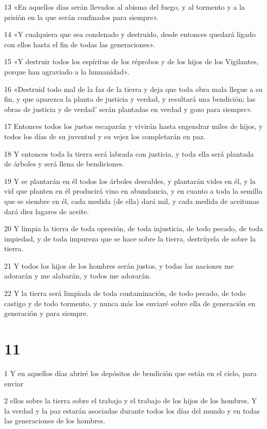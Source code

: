 \par 13 «En aquellos días serán llevados al abismo del fuego, y al tormento y a la prisión en la que serán confinados para siempre».
\par 14 «Y cualquiera que sea condenado y destruido, desde entonces quedará ligado con ellos hasta el fin de todas las generaciones».
\par 15 «Y destruir todos los espíritus de los réprobos y de los hijos de los Vigilantes, porque han agraviado a la humanidad».
\par 16 «Destruid todo mal de la faz de la tierra y deja que toda obra mala llegue a su fin, y que aparezca la planta de justicia y verdad, y resultará una bendición; las obras de justicia y de verdad' serán plantadas en verdad y gozo para siempre».
\par 17 Entonces todos los justos escaparán y vivirán hasta engendrar miles de hijos, y todos los días de su juventud y su vejez los completarán en paz.
\par 18 Y entonces toda la tierra será labrada con justicia, y toda ella será plantada de árboles y será llena de bendiciones.
\par 19 Y se plantarán en él todos los árboles deseables, y plantarán vides en él, y la vid que planten en él producirá vino en abundancia, y en cuanto a toda la semilla que se siembre en él, cada medida (de ella) dará mil, y cada medida de aceitunas dará diez lagares de aceite.
\par 20 Y limpia la tierra de toda opresión, de toda injusticia, de todo pecado, de toda impiedad, y de toda impureza que se hace sobre la tierra, destrúyela de sobre la tierra.
\par 21 Y todos los hijos de los hombres serán justos, y todas las naciones me adorarán y me alabarán, y todos me adorarán.
\par 22 Y la tierra será limpiada de toda contaminación, de todo pecado, de todo castigo y de todo tormento, y nunca más los enviaré sobre ella de generación en generación y para siempre.

\chapter{11}

\par 1 Y en aquellos días abriré los depósitos de bendición que están en el cielo, para enviar
\par 2 ellos sobre la tierra sobre el trabajo y el trabajo de los hijos de los hombres. Y la verdad y la paz estarán asociadas durante todos los días del mundo y en todas las generaciones de los hombres.

